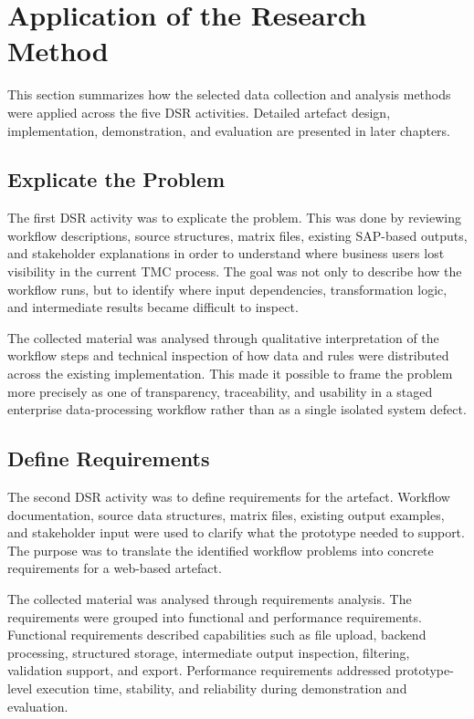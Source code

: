 \section{Application of the Research Method}

This section summarizes how the selected data collection and analysis methods were applied across the five DSR activities. Detailed artefact design, implementation, demonstration, and evaluation are presented in later chapters.

\subsection{Explicate the Problem}

The first DSR activity was to explicate the problem. This was done by reviewing workflow descriptions, source structures, matrix files, existing SAP-based outputs, and stakeholder explanations in order to understand where business users lost visibility in the current TMC process. The goal was not only to describe how the workflow runs, but to identify where input dependencies, transformation logic, and intermediate results became difficult to inspect.

The collected material was analysed through qualitative interpretation of the workflow steps and technical inspection of how data and rules were distributed across the existing implementation. This made it possible to frame the problem more precisely as one of transparency, traceability, and usability in a staged enterprise data-processing workflow rather than as a single isolated system defect.

\subsection{Define Requirements}

The second DSR activity was to define requirements for the artefact. Workflow documentation, source data structures, matrix files, existing output examples, and stakeholder input were used to clarify what the prototype needed to support. The purpose was to translate the identified workflow problems into concrete requirements for a web-based artefact.

The collected material was analysed through requirements analysis. The requirements were grouped into functional and performance requirements. Functional requirements described capabilities such as file upload, backend processing, structured storage, intermediate output inspection, filtering, validation support, and export. Performance requirements addressed prototype-level execution time, stability, and reliability during demonstration and evaluation.

